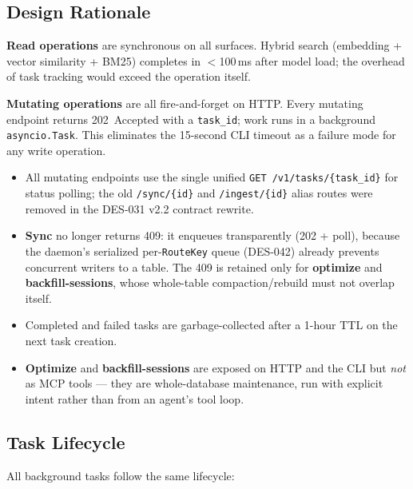 \documentclass[a4paper,10pt]{article}
\newcommand{\field}[1]{\texttt{#1}}
\begin{document}
\subsection{Design Rationale}

\textbf{Read operations} are synchronous on all surfaces.  Hybrid
search (embedding + vector similarity + BM25) completes in
$<$100\,ms after model load; the overhead of task tracking would
exceed the operation itself.

\textbf{Mutating operations} are all fire-and-forget on HTTP.  Every
mutating endpoint returns 202~Accepted with a \field{task\_id}; work
runs in a background \texttt{asyncio.Task}.  This eliminates the
15-second CLI timeout as a failure mode for any write operation.

\begin{itemize}
  \item All mutating endpoints use the single unified
    \texttt{GET /v1/tasks/\{task\_id\}} for status polling; the old
    \texttt{/sync/\{id\}} and \texttt{/ingest/\{id\}} alias routes were
    removed in the DES-031 v2.2 contract rewrite.
  \item \textbf{Sync} no longer returns 409: it enqueues transparently
    (202 + poll), because the daemon's serialized per-\texttt{RouteKey}
    queue (DES-042) already prevents concurrent writers to a table.  The
    409 is retained only for \textbf{optimize} and
    \textbf{backfill-sessions}, whose whole-table compaction/rebuild
    must not overlap itself.
  \item Completed and failed tasks are garbage-collected after a
    1-hour TTL on the next task creation.
  \item \textbf{Optimize} and \textbf{backfill-sessions} are exposed on
    HTTP and the CLI but \emph{not} as MCP tools --- they are
    whole-database maintenance, run with explicit intent rather than
    from an agent's tool loop.
\end{itemize}

\subsection{Task Lifecycle}

All background tasks follow the same lifecycle:
\end{document}
